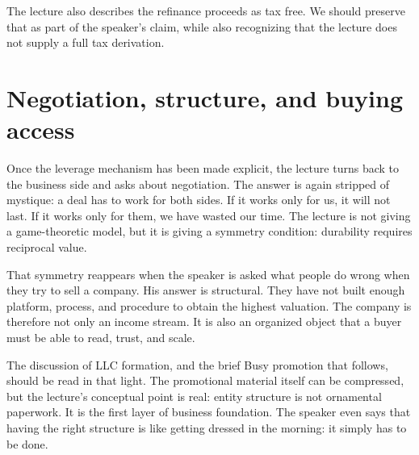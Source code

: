 \begin{figure}
\centering
{}
\end{figure}

The lecture also describes the refinance proceeds as tax free. We should preserve that as part of the speaker's claim, while also recognizing that the lecture does not supply a full tax derivation.

\section{Negotiation, structure, and buying access}

Once the leverage mechanism has been made explicit, the lecture turns back to the business side and asks about negotiation. The answer is again stripped of mystique: a deal has to work for both sides. If it works only for us, it will not last. If it works only for them, we have wasted our time. The lecture is not giving a game-theoretic model, but it is giving a symmetry condition: durability requires reciprocal value.

That symmetry reappears when the speaker is asked what people do wrong when they try to sell a company. His answer is structural. They have not built enough platform, process, and procedure to obtain the highest valuation. The company is therefore not only an income stream. It is also an organized object that a buyer must be able to read, trust, and scale.

The discussion of LLC formation, and the brief Busy promotion that follows, should be read in that light. The promotional material itself can be compressed, but the lecture's conceptual point is real: entity structure is not ornamental paperwork. It is the first layer of business foundation. The speaker even says that having the right structure is like getting dressed in the morning: it simply has to be done.

